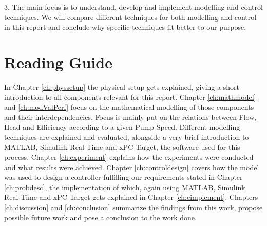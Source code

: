 3. The main focus is to understand, develop and implement modelling and control techniques.
We will compare different techniques for both modelling and control in this report
and conclude why specific techniques fit better to our purpose.
%
%
%
%
%
%
%
%
%
%
%
%

\section*{Reading Guide}
In Chapter \ref{ch:physsetup} the physical setup gets explained,
giving a short introduction to all components relevant for this report.
Chapter \ref{ch:mathmodel} and \ref{ch:modValPerf}
focus on the mathematical modelling of those components and their interdependencies.
Focus is mainly put on the relations between Flow, Head and Efficiency according to a given Pump Speed.
Different modelling techniques are explained and evaluated,
alongside a very brief introduction to MATLAB\textsuperscript{\textregistered{}},
Simulink\textsuperscript{\textregistered{}} Real-Time\texttrademark{} and xPC Target,
the software used for this process.
Chapter \ref{ch:experiment} explains how the experiments were conducted
and what results were achieved.
Chapter \ref{ch:controldesign} covers how the model was used to design a controller
fulfilling our requirements stated in Chapter \ref{ch:probdesc},
the implementation of which,
again using
MATLAB\textsuperscript{\textregistered{}},
Simulink\textsuperscript{\textregistered{}} Real-Time\texttrademark{}
and xPC Target gets explained in Chapter \ref{ch:cimplement}. 
Chapters \ref{ch:discussion} and \ref{ch:conclusion} summarize the findings from this work,
propose possible future work and pose a conclusion to the work done.
